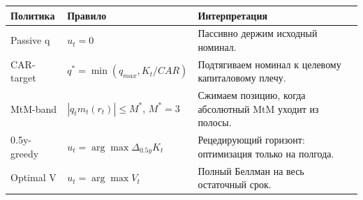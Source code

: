 \begin{tabular}{lll}
\toprule
Политика & Правило & Интерпретация \\
\midrule
Passive q & $u_t=0$ & Пассивно держим исходный номинал. \\
CAR-target & $q^*=\min(q_{max},K_t/CAR)$ & Подтягиваем номинал к целевому капиталовому плечу. \\
MtM-band & $|q_t m_t(r_t)|\le M^*$, $M^*=3$ & Сжимаем позицию, когда абсолютный MtM уходит из полосы. \\
0.5y-greedy & $u_t=\arg\max \Delta_{0.5y}K_t$ & Рецедирующий горизонт: оптимизация только на полгода. \\
Optimal V & $u_t=\arg\max V_t$ & Полный Беллман на весь остаточный срок. \\
\bottomrule
\end{tabular}
